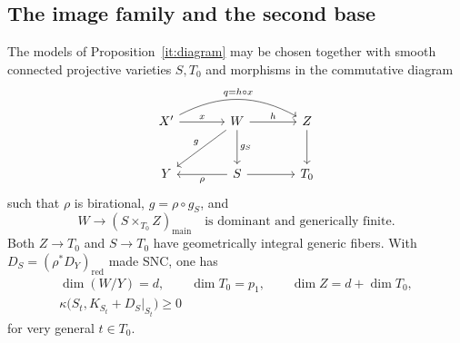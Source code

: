 \subsection{The image family and the second base}

\begin{proposition}\label{it:dimensions}
The models of Proposition~\ref{it:diagram} may be chosen together with
smooth connected projective varieties $S,T_0$ and morphisms in the
commutative diagram
\begin{equation}\label{it:full-diagram}
\begin{tikzcd}[column sep=large,row sep=large]
 X' \arrow[r,"x"] \arrow[rr,bend left=28,"q=h\circ x"]
 & W \arrow[r,"h"] \arrow[d,"g_S"] \arrow[dl,"g"']
 & Z \arrow[d]
 \\
 Y
 & S \arrow[l,"\rho"] \arrow[r]
 & T_0
\end{tikzcd}
\end{equation}
such that $\rho$ is birational, $g=\rho\circ g_S$, and
\begin{equation}\label{it:product-map}
 W\longrightarrow(S\times_{T_0}Z)_{\mathrm{main}}
 \quad\text{is dominant and generically finite}.
\end{equation}
Both $Z\to T_0$ and $S\to T_0$ have geometrically integral generic
fibers.  With $D_S=(\rho^*D_Y)_{\mathrm{red}}$ made SNC, one has
\begin{equation}\label{it:dimension-equations}
 \begin{gathered}
  \dim(W/Y)=d,\qquad
  \dim T_0=p_1,\qquad
  \dim Z=d+\dim T_0,\\
  \kappa\bigl(S_t,K_{S_t}+D_S|_{S_t}\bigr)\geq0
 \end{gathered}
\end{equation}
for very general $t\in T_0$.
\end{proposition}

